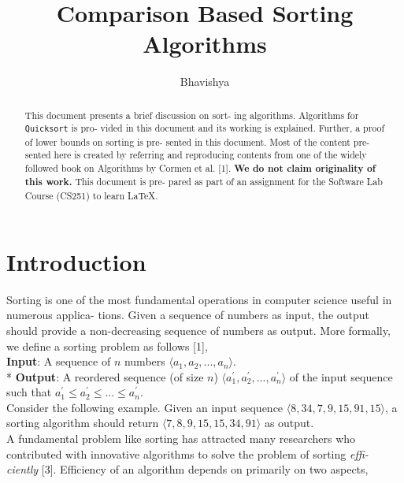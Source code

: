 \documentclass[a4paper, 10pt,twocolumn]{article}
\title{Comparison Based Sorting Algorithms}
\author{Bhavishya}
\date{}
\begin{document}
\maketitle
\begin{abstract}
This document presents a brief discussion on sort-
    ing algorithms. Algorithms for \texttt{Quicksort} is pro-
vided in this document and its working is explained.
Further, a proof of lower bounds on sorting is pre-
sented in this document. Most of the content pre-
sented here is created by referring and reproducing
contents from one of the widely followed book on
Algorithms by Cormen et al. [1]. \textbf{We do not claim
originality of this work.} This document is pre-
pared as part of an assignment for the Software Lab
Course (CS251) to learn \LaTeX.

\noindent{}%
\end{abstract}    
\section{Introduction}

Sorting is one of the most fundamental operations
in computer science useful in numerous applica-
tions. Given a sequence of numbers as input, the
output should provide a non-decreasing sequence
of numbers as output. More formally, we define a
sorting problem as follows [1],\\
\textbf{Input}: A sequence of $n$ numbers $\langle a_{1}, a_{2},...,a_{n}\rangle$.\\*
\textbf{Output}: A reordered sequence (of size $n$)
$\langle a_{1}^{'},a_{2}^{'}, ..., a_{n}^{'} \rangle$ of the input sequence such that $a_{1}^{'} \leq a_{2}^{'}\leq...\leq a_{n}^{'}$.\\

Consider the following example. Given an input
sequence $\langle 8, 34, 7, 9, 15, 91, 15\rangle$, a sorting algorithm should return $\langle 7, 8, 9, 15, 15, 34, 91\rangle$ as output.\\

A fundamental problem like sorting has attracted
many researchers who contributed with innovative
algorithms to solve the problem of sorting \textit{effi-
ciently} [3]. Efficiency of an algorithm depends on
primarily on two aspects,
\end{document}
